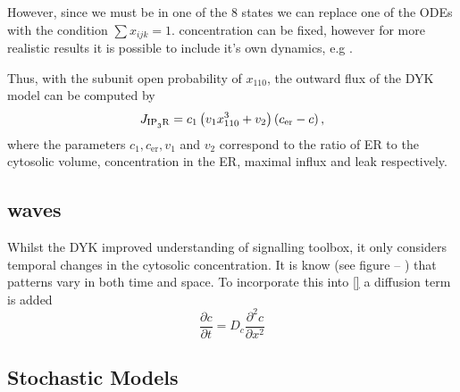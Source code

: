 \documentclass[../main.tex]{subfiles}
\begin{document}
However, since we must be in one of the 8 states we can replace one of the ODEs with the condition $\sum x_{ijk} = 1$.  concentration can be fixed, however for more realistic results it is possible to include it's own dynamics, e.g \cite{DeYoung_1992, Cuthbertson_1991, Chay_1995,Kummer_2005}.

Thus, with the  subunit open probability of $x_{110}$, the outward flux of the DYK model can be computed by
\begin{equation}
J_{\mathrm{\ce{IP_3R}}} = c_1 \left( v_1 x_{110}^3 +v_2 \right) \left(c_{\mathrm{er}} - c \right),
\end{equation}
where the parameters $c_1, c_{\mathrm{er}}, v_1$ and $v_2$ correspond to the ratio of ER to the cytosolic volume,  concentration in the ER, maximal  influx and  leak respectively. 
    
    
    
\subsection{ waves}
Whilst the DYK improved understanding of  signalling toolbox, it only considers temporal changes in the cytosolic  concentration. It is know (see figure -- ) that  patterns vary in both time and space. To incorporate this into \eqref{} a diffusion term is added
\begin{equation}
\frac{\partial c}{\partial t} = D_c\frac{\partial^2 c}{\partial x^2}
\end{equation}

\subsection{Stochastic Models}
   
\end{document}
